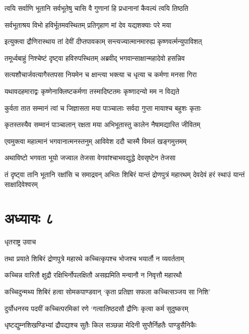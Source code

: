 \twolineshloka
{त्वयि सर्वाणि भूतानि सर्वभूतेषु चासि वै}
{गुणानां हि प्रधानानां कैवल्यं त्वयि तिष्ठति}


\twolineshloka
{सर्वभूताश्रय विभो हविर्भूतमवस्थितम्}
{प्रतिगृहाण मां देव यद्यशक्याः परे मया}


\twolineshloka
{इत्युक्त्वा द्रौणिरास्थाय तां देवीं दीप्तपावकाम्}
{सन्त्यज्यात्मानमारुह्य कृष्णवर्त्मन्युपाविशत्}


\twolineshloka
{तमूर्ध्वबाहुं निश्चेष्टं दृष्ट्वा हविरुपस्थितम्}
{अब्रवीद् भगवान्साक्षान्महादेवो हसन्निव}


\twolineshloka
{सत्यशौचार्जवत्यागैस्तपसा नियमेन च}
{क्षान्त्या भक्त्या च धृत्या च कर्मणा मनसा गिरा}


\twolineshloka
{यथावदहमाराद्वः कृष्णेनाक्लिष्टकर्मणा}
{तस्मादिष्टतमः कृष्णादन्यो मम न विद्यते}


\twolineshloka
{कुर्वता तात सम्मानं त्वां च जिज्ञासता मया}
{पाञ्चालाः सर्वदा गुप्ता मायाश्च बहुशः कृताः}


\twolineshloka
{कृतस्तस्यैव सम्मानं पाञ्चालान् रक्षता मया}
{अभिभूतास्तु कालेन नैषामद्यास्ति जीवितम्}


\twolineshloka
{एवमुक्त्वा महात्मानं भगवानात्मनस्तनुम्}
{आविवेश ददौ चास्मै विमलं खङ्गमुत्तमम्}


\twolineshloka
{अथाविष्टो भगवता भूयो जज्वाल तेजसा}
{वेगवांश्चाभवद्युद्धे देवसृष्टेन तेजसा}


\threelineshloka
{तं दृष्ट्वा तानि भूतानि रक्षांसि च समाद्रवन्}
{अभितः शिबिरं यान्तं द्रोणपुत्रं महारथम्}
{देवदेवं हरं स्थाउं यान्तं साक्षादिवेश्वरम्}


\chapter{अध्यायः ८}
\twolineshloka
{धृतराष्ट्र उवाच}
{}


\twolineshloka
{तथा प्रयाते शिबिरं द्रोणपुत्रे महारथे}
{कच्चित्कृपश्च भोजश्च भयार्तौ न व्यवर्तताम्}


\twolineshloka
{कच्चिन्न वारितौ क्षुद्रौ रक्षिभिर्नोपलक्षितौ}
{असह्यमिति मन्वानौ न निवृत्तौ महारथौ}


\twolineshloka
{कच्चिदुन्मथ्य शिबिरं हत्वा सोमकपाण्डवान्}
{`कृता प्रतिज्ञा सफला कच्चित्सञ्जय सा निशि'}


\twolineshloka
{दुर्योधनस्य पदवीं कच्चित्परमिकां रणे}
{`गत्वातिष्ठदसौ द्रौणिः कृत्वा कर्म सुदुष्करम्}


\twolineshloka
{धृष्टद्युम्नशिखण्डिभ्यां द्रौपद्याश्च सुतैः किल}
{सञ्छन्ना मेदिनी सुप्तैर्निहतैः पाण्डुसैनिकैः}


